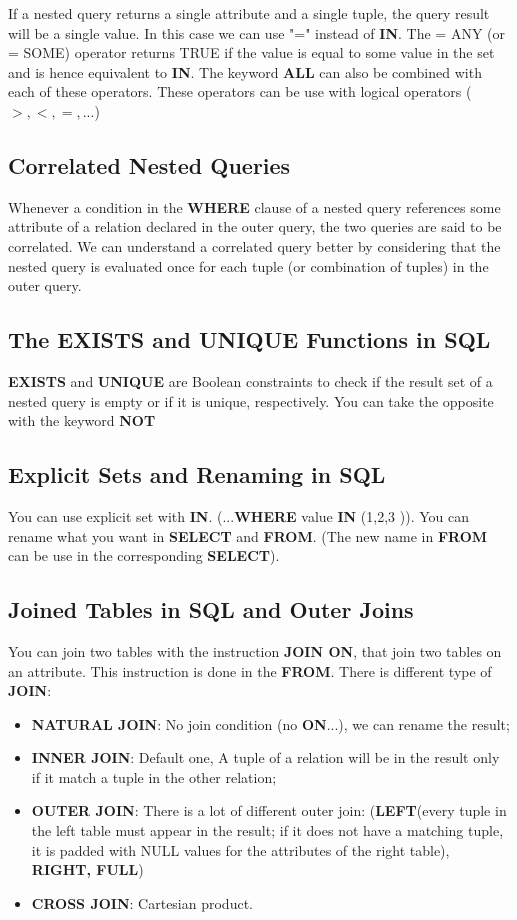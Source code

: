 If a nested query returns a single attribute and a single tuple, the query result will be a single value. In this case we can use "=" instead of \textbf{IN}. The = ANY (or = SOME) operator returns TRUE if the value is equal to some value in the set and is hence equivalent to \textbf{IN}. The keyword \textbf{ALL} can also be combined with each of these operators. These operators can be use with logical operators ($>,<, =, ...$)

\subsection{Correlated Nested Queries}
Whenever a condition in the \textbf{WHERE} clause of a nested query references some attribute of a relation declared in the outer query, the two queries are said to be correlated. We can understand a correlated query better by considering that the nested query is evaluated once for each tuple (or combination of tuples) in the outer query.
\subsection{The EXISTS and UNIQUE Functions in SQL}
\textbf{EXISTS} and \textbf{UNIQUE} are Boolean constraints to check if the result set of a nested query is empty or if it is unique, respectively. You can take the opposite with the keyword \textbf{NOT}

\subsection{Explicit Sets and Renaming in SQL}
You can use explicit set with \textbf{IN}. (...\textbf{WHERE} value \textbf{IN} (1,2,3 )).
You can rename what you want in \textbf{SELECT} and \textbf{FROM}. (The new name in \textbf{FROM} can be use in the corresponding \textbf{SELECT}).
\subsection{Joined Tables in SQL and Outer Joins}
You can join two tables with the instruction \textbf{JOIN ON}, that join two tables on an attribute. This instruction is done in the \textbf{FROM}. There is different type of \textbf{JOIN}:
\begin{itemize}
\item \textbf{NATURAL JOIN}: No join condition (no \textbf{ON}...), we can rename the result;
\item \textbf{INNER JOIN}: Default one, A tuple of a relation will be in the result only if it match a tuple in the other relation;
\item \textbf{OUTER JOIN}: There is a lot of different outer join: (\textbf{LEFT}(every tuple in the left table must appear in the result; if it does not have a matching tuple, it is padded with NULL values for the attributes of the right table), \textbf{RIGHT, FULL})
\item \textbf{CROSS JOIN}: Cartesian product.
\end{itemize}
